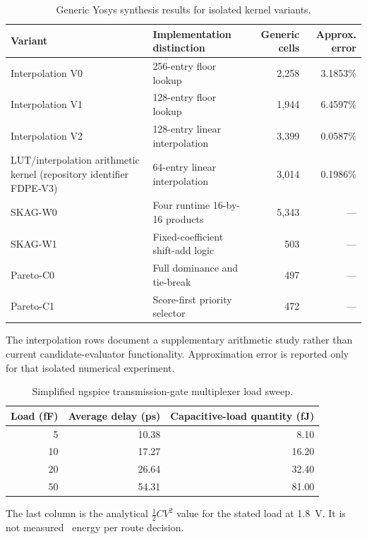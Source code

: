 \begin{table}[H]
\centering
\caption{Generic Yosys synthesis results for isolated kernel variants.}
\label{tab:vlsi-generic-cells}
\begin{tabularx}{\textwidth}{@{}p{}Xrr@{}}
\toprule
\textbf{Variant} & \textbf{Implementation distinction} &
\textbf{Generic cells} & \textbf{Approx. error}\\
\midrule
Interpolation V0 & 256-entry floor lookup & 2,258 & 3.1853\%\\
Interpolation V1 & 128-entry floor lookup & 1,944 & 6.4597\%\\
Interpolation V2 & 128-entry linear interpolation & 3,399 & 0.0587\%\\
LUT/interpolation arithmetic kernel (repository identifier FDPE-V3) &
64-entry linear interpolation & 3,014 & 0.1986\%\\
SKAG-W0 & Four runtime 16-by-16 products & 5,343 & ---\\
SKAG-W1 & Fixed-coefficient shift-add logic & 503 & ---\\
Pareto-C0 & Full dominance and tie-break & 497 & ---\\
Pareto-C1 & Score-first priority selector & 472 & ---\\
\bottomrule
\end{tabularx}
\end{table}

The interpolation rows document a supplementary arithmetic study rather than
current candidate-evaluator functionality. Approximation error is reported only for
that isolated numerical experiment.

\begin{table}[H]
\centering
\caption{Simplified ngspice transmission-gate multiplexer load sweep.}
\label{tab:cmos-sweep}
\begin{tabular}{@{}rrr@{}}
\toprule
\textbf{Load (fF)} & \textbf{Average delay (ps)} &
\textbf{Capacitive-load quantity (fJ)}\\
\midrule
5 & 10.38 & 8.10\\
10 & 17.27 & 16.20\\
20 & 26.64 & 32.40\\
50 & 54.31 & 81.00\\
\bottomrule
\end{tabular}
\end{table}

The last column is the analytical $\tfrac{1}{2}CV^2$ value for the stated load at
1.8~V. It is not measured \QFlow\ energy per route decision.
